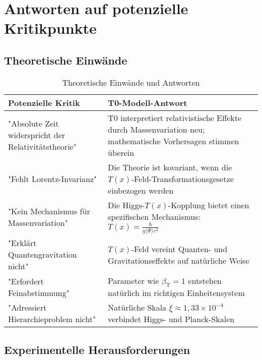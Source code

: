 \documentclass[12pt,a4paper]{article}
\newcommand{\Tfield}{T(x)}
\newcommand{\betaT}{\beta_{\text{T}}}
\begin{document}
	\section{Antworten auf potenzielle Kritikpunkte}
	
	\subsection{Theoretische Einwände}
	
	\begin{table}[h]
		\centering
		\begin{tabular}{>{\RaggedRight}p{} >{\RaggedRight}p{}}
			\toprule
			\textbf{Potenzielle Kritik} & \textbf{T0-Modell-Antwort} \\
			\midrule
			"Absolute Zeit widerspricht der Relativitätstheorie" & T0 interpretiert relativistische Effekte durch Massenvariation neu; mathematische Vorhersagen stimmen überein \\
			"Fehlt Lorentz-Invarianz" & Die Theorie ist kovariant, wenn die $\Tfield$-Feld-Transformationsgesetze einbezogen werden \\
			"Kein Mechanismus für Massenvariation" & Die Higgs-$\Tfield$-Kopplung bietet einen spezifischen Mechanismus: $\Tfield = \frac{\hbar}{y \langle \Phi \rangle c^2}$ \\
			"Erklärt Quantengravitation nicht" & $\Tfield$-Feld vereint Quanten- und Gravitationseffekte auf natürliche Weise \\
			"Erfordert Feinabstimmung" & Parameter wie $\betaT = 1$ entstehen natürlich im richtigen Einheitensystem \\
			"Adressiert Hierarchieproblem nicht" & Natürliche Skala $\xi \approx 1,33 \times 10^{-4}$ verbindet Higgs- und Planck-Skalen \\
			\bottomrule
		\end{tabular}
		\caption{Theoretische Einwände und Antworten}
	\end{table}
	
	\subsection{Experimentelle Herausforderungen}
	
\end{document}
